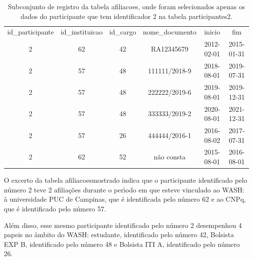 \documentclass[
12pt,		%
openright,	%
twoside,  %
a4paper,			%
chapter=TITLE,		%
english,			%
french,				%
spanish,			%
brazil				%
]{USPSC-classe/USPSC}
\begin{document}
\begin{table}[htb]
\tiny
\caption{\label{e6120545268b93238330297571c4756e7c97df1a}Subconjunto de registro da tabela afiliacoes, onde foram selecionados apenas os dados do participante que tem identificador 2 na tabela participantes2.}

\centering
\begin{tabular}{|c|c|c|c|c|c|}
\hline
id\_participante  &  id\_instituicao  &  id\_cargo  &  nome\_documento  &  inicio      &  fim \\
              2  &              62  &        42  &  RA12345679      &  2012-02-01  &  2015-01-31  \\
              2  &              57  &        48  &  111111/2018-9   &  2018-08-01  &  2019-07-31  \\
              2  &              57  &        48  &  222222/2019-6   &  2019-08-01  &  2019-12-31  \\
              2  &              57  &        48  &  333333/2019-2   &  2020-08-01  &  2021-12-31  \\
              2  &              57  &        26  &  444444/2016-1   &  2016-08-02  &  2017-07-31  \\
              2  &              62  &        52  &  n\~ao consta      &  2015-08-01  &  2016-08-01 \\
\hline
\end{tabular}
\end{table}


O excerto da tabela \textquotedbl afiliacoes\textquotedbl  mostrado indica que o participante identificado pelo n\'umero 2 teve 2 afilia\c{c}\~oes durante o per\'{\i}odo em que esteve vinculado ao WASH: \`a universidade PUC de Campinas, que \'e identificada pelo n\'umero 62 e ao CNPq, que \'e identificado pelo n\'umero 57.

















Al\'em disso, esse mesmo participante identificado pelo n\'umero 2 desempenhou 4 papeis no \^ambito do WASH: estudante, identificado pelo n\'umero 42, Bolsista EXP B, identificado pelo n\'umero 48 e Bolsista ITI A, identificado pelo n\'umero 26.
\end{document}
